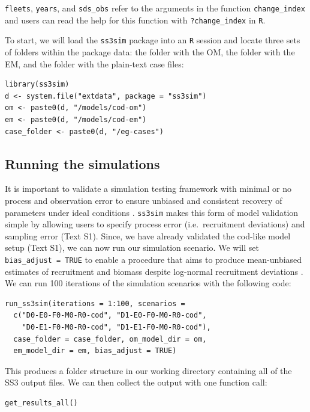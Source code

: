 \documentclass[12pt]{article}
\begin{document}
\noindent
\texttt{fleets}, \texttt{years}, and \texttt{sds\_obs} refer to the arguments in the function \texttt{change\_index} and users can read the help for this function with \texttt{?change\_index} in \texttt{R}.

To start, we will load the \texttt{ss3sim} package into an \texttt{R} session and locate three sets of folders within the package data: the folder with the OM, the folder with the EM, and the folder with the plain-text case files:

\begin{verbatim}
library(ss3sim)
d <- system.file("extdata", package = "ss3sim")
om <- paste0(d, "/models/cod-om")
em <- paste0(d, "/models/cod-em")
case_folder <- paste0(d, "/eg-cases")
\end{verbatim}

\subsection*{Running the simulations}

It is important to validate a simulation testing framework with minimal or no process and observation error to ensure unbiased and consistent recovery of parameters under ideal conditions \cite{hilborn1992, rykiel1996}. \texttt{ss3sim} makes this form of model validation simple by allowing users to specify process error (i.e.~recruitment deviations) and sampling error (Text S1). Since, we have already validated the cod-like model setup (Text S1), we can now run our simulation scenario. We will set \texttt{bias\_adjust = TRUE} to enable a procedure that aims to produce mean-unbiased estimates of recruitment and biomass despite log-normal recruitment deviations \cite{methot2011}. We can run 100 iterations of the simulation scenarios with the following code:

\begin{verbatim}
run_ss3sim(iterations = 1:100, scenarios =
  c("D0-E0-F0-M0-R0-cod", "D1-E0-F0-M0-R0-cod",
    "D0-E1-F0-M0-R0-cod", "D1-E1-F0-M0-R0-cod"),
  case_folder = case_folder, om_model_dir = om,
  em_model_dir = em, bias_adjust = TRUE)
\end{verbatim}

This produces a folder structure in our working directory containing all of the SS3 output files. We can then collect the output with one function call:

\begin{verbatim}
get_results_all()
\end{verbatim}
\end{document}
